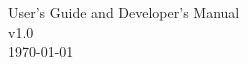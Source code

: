
  \begin{center}
{\huge User's Guide and Developer's Manual \\}
{\huge v1.0\\ \today}

  \end{center}

